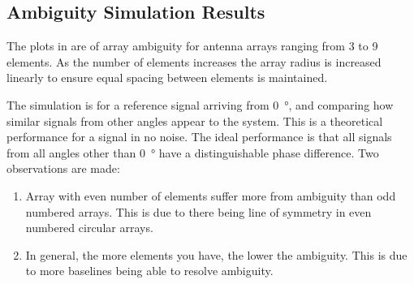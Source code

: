 \subsection{Ambiguity Simulation Results}
The plots in  are of array ambiguity for antenna arrays ranging from 3 to 9 elements. As the number of elements increases the array radius is increased linearly to ensure equal spacing between elements is maintained.

The simulation is for a reference signal arriving from \SI{0}{\degree}, and comparing how similar signals from other angles appear to the system. This is a theoretical performance for a signal in no noise. The ideal performance is that all signals from all angles other than \SI{0}{\degree} have a distinguishable phase difference. Two observations are made:
\begin{enumerate}
  \item Array with even number of elements suffer more from ambiguity than odd numbered arrays. This is due to there being line of symmetry in even numbered circular arrays.
  \item In general, the more elements you have, the lower the ambiguity. This is due to more baselines being able to resolve ambiguity.
\end{enumerate}

